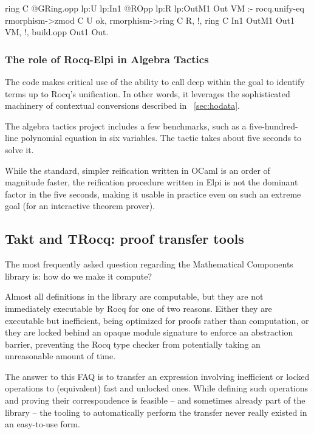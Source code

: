 \documentclass{these-ISSS}
\newenvironment{elpicode}
  {\VerbatimEnvironment\begin{elpibox}\begin{xelpicode}}{\end{xelpicode}
\end{elpibox}}
\begin{document}
\begin{elpicode}
ring C {{ @GRing.opp lp:U lp:In1 }} {{ @ROpp lp:R lp:OutM1 }} Out VM :-
  rocq.unify-eq { rmorphism->zmod C } U ok,
  rmorphism->ring C R, !,
  ring C In1 OutM1 Out1 VM, !,
  build.opp Out1 Out.  
\end{elpicode}

\subsubsection{The role of Rocq-Elpi in Algebra Tactics}


The code makes critical use of the ability to call  deep
within the goal to identify terms up to Rocq's unification. In other words, it
leverages the sophisticated machinery of contextual conversions described in
~\cref{sec:hodata}.

The algebra tactics project includes a few benchmarks, such as a
five-hundred-line polynomial equation in six variables. The  tactic takes about
five seconds to solve it.

While the standard, simpler reification written in OCaml is an order of
magnitude faster, the reification procedure written in Elpi is not the dominant
factor in the five seconds, making it usable in practice even on such an
extreme goal (for an interactive theorem prover).


\subsection{Takt and TRocq: proof transfer tools}


The most frequently asked question regarding the Mathematical Components
library is: how do we make it compute?

Almost all definitions in the library are computable, but they are not
immediately executable by Rocq for one of two reasons. Either they are
executable but inefficient, being optimized for proofs rather than
computation, or they are locked behind an opaque module signature to enforce
an abstraction barrier, preventing the Rocq type checker from potentially
taking an unreasonable amount of time.

The answer to this FAQ is to transfer an expression involving inefficient or
locked operations to (equivalent) fast and unlocked ones. While defining such
operations and proving their correspondence is feasible -- and sometimes already
part of the library -- the tooling to automatically perform the transfer never
really existed in an easy-to-use form.
\end{document}
